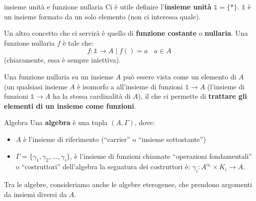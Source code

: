 \documentclass[a4paper,11pt]{report}
\begin{document}
\begin{gframe}{insieme unità e funzione nullaria}
    Ci è utile definire l'\textbf{insieme unità} \( \mathbb{1} = \{*\} \). \( \mathbb{1} \) è un insieme formato da un solo elemento (non ci interessa quale). 

    Un altro concetto che ci servirà è quello di \textbf{funzione costante} o \textbf{nullaria}. Una funzione nullaria \( f \) è tale che:
    \[
        f: \mathbb{1} \to A \mid f() = a \ \ \ \ a\in A
    \]
    (chiaramente, essa è sempre iniettiva).

    \begin{gframe}{}

        Una funzione nullaria su un insieme \( A \) può essere vista come un elemento di \( A \) (un qualsiasi insieme \( A \) è isomorfo a all'insieme di funzioni \( \mathbb{1}\to A \) (l'insieme di funzioni \( \mathbb{1}\to A \) ha la stessa cardinalità di \( A \)), il che ci permette di \textbf{trattare gli elementi di un insieme come funzioni}.


    \end{gframe}
\end{gframe}

\begin{defframe}{Algebra}{}
    Una \textbf{algebra} è una tupla \( (A, \Gamma) \), dove:
    \begin{itemize}
        \item \( A \) è l'insieme di riferimento (``carrier'' o ``insieme sottostante'') 
        \item \( \Gamma = \{\gamma_1, \gamma_2, \dots, \gamma_i\} \), è l'insieme di funzioni chiamate ``operazioni fondamentali'' o ``costruttori'' dell'algebra
            \subitem la segnatura dei costruttori è: \( \gamma_i:A^{\alpha_i}\times K_i \to A \).

    \end{itemize}
    \begin{gframe}{}
        Tra le algebre, consideriamo anche le algebre eterogenee, che prendono argomenti da insiemi diversi da \( A \).
    \end{gframe}
\end{defframe}
\end{document}
